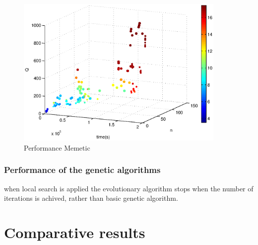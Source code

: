 \begin{figure}[!htbp]
  \begin{center}
   \includegraphics[width=0.9\textwidth]{Images/Chapter5/compare_expected_distance_memetic.eps}
  \end{center}
    \caption{Performance Memetic}\label{fig:compare_expected_distance_memetic}
\end{figure}

\subsubsection*{Performance of the genetic algorithms}

when local search is applied the evolutionary algorithm stops when the number of iterations is achived, rather than basic genetic algorithm.




\section{Comparative results}

